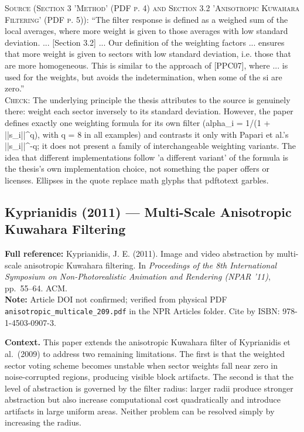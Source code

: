 \documentclass[11pt, a4paper]{article}
\begin{document}
\begin{itemize}[leftmargin=1.2em,itemsep=4pt]
\textsc{Source (Section 3 'Method' (PDF p. 4) and Section 3.2 'Anisotropic Kuwahara Filtering' (PDF p. 5)):} ``The filter response is defined as a weighed sum of the local averages, where more weight is given to those averages with low standard deviation. ... [Section 3.2] ... Our definition of the weighting factors ... ensures that more weight is given to sectors with low standard deviation, i.e. those that are more homogeneous. This is similar to the approach of [PPC07], where ... is used for the weights, but avoids the indetermination, when some of the si are zero.''\\
\textsc{Check:} The underlying principle the thesis attributes to the source is genuinely there: weight each sector inversely to its standard deviation. However, the paper defines exactly one weighting formula for its own filter (alpha\_i = 1/(1 + ||s\_i||\textasciicircum{}q), with q = 8 in all examples) and contrasts it only with Papari et al.'s ||s\_i||\textasciicircum{}-q; it does not present a family of interchangeable weighting variants. The idea that different implementations follow 'a different variant' of the formula is the thesis's own implementation choice, not something the paper offers or licenses. Ellipses in the quote replace math glyphs that pdftotext garbles.
\end{itemize}

\vspace{8pt}
\subsection{Kyprianidis (2011) --- Multi-Scale Anisotropic Kuwahara Filtering}

\begin{refbox}
\textbf{Full reference:} Kyprianidis, J. E. (2011). Image and video abstraction by multi-scale anisotropic Kuwahara filtering. In \textit{Proceedings of the 8th International Symposium on Non-Photorealistic Animation and Rendering (NPAR '11)}, pp.\ 55--64. ACM.\\[4pt]
\textbf{Note:} Article DOI not confirmed; verified from physical PDF \texttt{anisotropic\_multicale\_209.pdf} in the NPR Articles folder. Cite by ISBN: 978-1-4503-0907-3.
\end{refbox}

\textbf{Context.} This paper extends the anisotropic Kuwahara filter of Kyprianidis et al.\ (2009) to address two remaining limitations. The first is that the weighted sector voting scheme becomes unstable when sector weights fall near zero in noise-corrupted regions, producing visible block artifacts. The second is that the level of abstraction is governed by the filter radius: larger radii produce stronger abstraction but also increase computational cost quadratically and introduce artifacts in large uniform areas. Neither problem can be resolved simply by increasing the radius.
\end{document}
